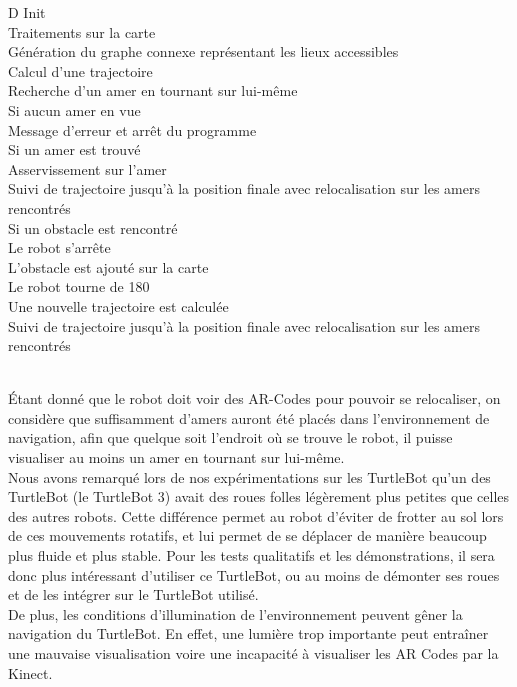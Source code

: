 \documentclass[10pt,a4paper]{article}
\begin{document}
\begin{tabbing}
\>D\>
Init\\\>\>\>
	Traitements sur la carte\\\>\>\>
	Génération du graphe connexe représentant les lieux accessibles\\\>\>\>
	Calcul d'une trajectoire\\\>\>
Recherche d'un amer en tournant sur lui-même\\\>\>
Si aucun amer en vue\\\>\>\>
	Message d'erreur et arrêt du programme\\\>\>
Si un amer est trouvé\\\>\>\>
	Asservissement sur l'amer\\\>\>\>
	Suivi de trajectoire jusqu'à la position finale avec relocalisation sur les amers rencontrés\\\>\>
Si un obstacle est rencontré\\\>\>\>
	Le robot s'arrête\\\>\>\>
	L'obstacle est ajouté sur la carte\\\>\>\>
	Le robot tourne de 180\degree\\\>\>\>
	Une nouvelle trajectoire est calculée\\\>\>
Suivi de trajectoire jusqu'à la position finale avec relocalisation sur les amers rencontrés\\\\
	
\end{tabbing}


Étant donné que le robot doit voir des AR-Codes pour pouvoir se relocaliser, on considère que suffisamment d'amers auront été placés dans l'environnement de navigation, afin que quelque soit l'endroit où se trouve le robot, il puisse visualiser au moins un amer en tournant sur lui-même.\\

Nous avons remarqué lors de nos expérimentations sur les TurtleBot qu'un des TurtleBot (le TurtleBot 3) avait des roues folles légèrement plus petites que celles des autres robots. Cette différence permet au robot d'éviter de frotter au sol lors de ces mouvements rotatifs, et lui permet de se déplacer de manière beaucoup plus fluide et plus stable. Pour les tests qualitatifs et les démonstrations, il sera donc plus intéressant d'utiliser ce TurtleBot, ou au moins de démonter ses roues et de les intégrer sur le TurtleBot utilisé.\\

De plus, les conditions d'illumination de l'environnement peuvent gêner la navigation du TurtleBot. En effet, une lumière trop importante peut entraîner une mauvaise visualisation voire une incapacité à visualiser les AR Codes par la Kinect. \\
\end{document}
